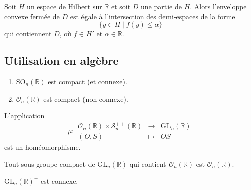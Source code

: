 
  \begin{corollary}
    Soit $H$ un espace de Hilbert sur $\mathbb{R}$ et soit $D$ une partie de $H$. Alors l'enveloppe convexe fermée de $D$ est égale à l'intersection des demi-espaces de la forme
    \[ \{ y \in H \mid f(y) \leq \alpha \} \]
    qui contiennent $D$, où $f \in H'$ et $\alpha \in \mathbb{R}$.
  \end{corollary}

  \subsection{Utilisation en algèbre}


  \begin{proposition}
    \begin{enumerate}[label={\bfseries(\roman*)}]
      \item $\mathrm{SO}_n(\mathbb{R})$ est compact (et connexe).
      \item $\mathcal{O}_n(\mathbb{R})$ est compact (non-connexe).
    \end{enumerate}
  \end{proposition}


  \begin{application}
    L'application
    \[ \mu :
    \begin{array}{ccc}
      \mathcal{O}_n(\mathbb{R}) \times \mathcal{S}_n^{++}(\mathbb{R}) &\rightarrow& \mathrm{GL}_n(\mathbb{R}) \\
      (O, S) &\mapsto& OS
    \end{array}
    \]
    est un homéomorphisme.
  \end{application}

  \begin{corollary}
    Tout sous-groupe compact de $\mathrm{GL}_n(\mathbb{R})$ qui contient $\mathcal{O}_n(\mathbb{R})$ est $\mathcal{O}_n(\mathbb{R})$.
  \end{corollary}


  \begin{corollary}
    $\mathrm{GL}_n(\mathbb{R})^+$ est connexe.
  \end{corollary}


